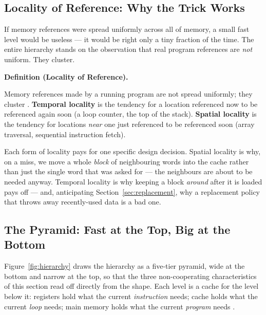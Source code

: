 \documentclass[11pt]{article}
\newenvironment{definitionbox}[1]{%
  \par\noindent\textbf{Definition (#1).}\ \itshape
}{\par\vspace{0.3em}}
\begin{document}
\subsection{Locality of Reference: Why the Trick Works}

If memory references were spread uniformly across all of memory, a small fast level would be useless --- it would be right only a tiny fraction of the time. The entire hierarchy stands on the observation that real program references are \emph{not} uniform. They cluster.

\begin{definitionbox}{Locality of Reference}
Memory references made by a running program are not spread uniformly; they cluster \cite[\S4.1, printed pp.~112--117]{Stallings2015_computer_organization}. \textbf{Temporal locality} is the tendency for a location referenced now to be referenced again soon (a loop counter, the top of the stack). \textbf{Spatial locality} is the tendency for locations \emph{near} one just referenced to be referenced soon (array traversal, sequential instruction fetch).
\end{definitionbox}

Each form of locality pays for one specific design decision. Spatial locality is why, on a miss, we move a whole \emph{block} of neighbouring words into the cache rather than just the single word that was asked for --- the neighbours are about to be needed anyway. Temporal locality is why keeping a block \emph{around} after it is loaded pays off --- and, anticipating Section~\ref{sec:replacement}, why a replacement policy that throws away recently-used data is a bad one.

\subsection{The Pyramid: Fast at the Top, Big at the Bottom}

Figure~\ref{fig:hierarchy} draws the hierarchy as a five-tier pyramid, wide at the bottom and narrow at the top, so that the three non-cooperating characteristics of this section read off directly from the shape. Each level is a cache for the level below it: registers hold what the current \emph{instruction} needs; cache holds what the current \emph{loop} needs; main memory holds what the current \emph{program} needs \cite[Fig.~4.6, PDF p.~160]{Stallings2015_computer_organization}.
\end{document}
